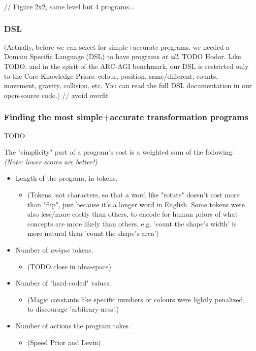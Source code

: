 \documentclass{article}
\begin{document}
// Figure 2x2, same level but 4 programs...

\subsubsection{DSL}

(Actually, before we can select for simple+accurate programs, we needed a Domain Specific Language (DSL) to have programs \textit{at all}. TODO Hodor. Like TODO, and in the spirit of the ARC-AGI benchmark, our DSL is restricted only to the Core Knowledge Priors: colour, position, same/different, counts, movement, gravity, collision, etc. You can read the full DSL documentation in our open-source code.) // avoid overfit

\subsubsection{Finding the most simple+accurate transformation programs}

TODO

The "simplicity" part of a program's cost is a weighted sum of the following: \textit{(Note: lower scores are better!)}

\begin{itemize}
    \item Length of the program, in tokens.
    \begin{itemize}
        \item (Tokens, not characters, so that a word like "rotate" doesn't cost more than "flip", just because it's a longer word in English. Some tokens were also less/more costly than others, to encode for human priors of what concepts are more likely than others, e.g. 'count the shape's width' is more natural than 'count the shape's area')
    \end{itemize}
    \item Number of \textit{unique} tokens.
    \begin{itemize}
        \item (TODO close in idea-space)
    \end{itemize}
    \item Number of "hard-coded" values.
    \begin{itemize}
        \item (Magic constants like specific numbers or colours were lightly penalized, to discourage 'arbitrary-ness'.)
    \end{itemize}
    \item Number of actions the program takes.
    \begin{itemize}
        \item (Speed Prior and Levin)
    \end{itemize}
\end{itemize}
\end{document}

